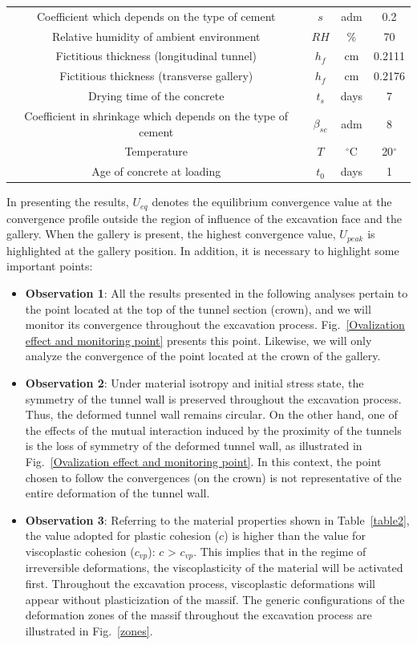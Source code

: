 \documentclass[a4paper,fleqn]{cas-sc}
\begin{document}
\begin{table}
\begin{tabular}{c c c c}
		Coefficient which depends on the type of cement & $s$ & adm & 0.2 \\
		Relative humidity of ambient environment & $RH$ & \% & 70 \\
		Fictitious thickness (longitudinal tunnel) & $h_f$ & cm & 0.2111 \\
		Fictitious thickness (transverse gallery) & $h_f$ & cm & 0.2176 \\
		Drying time of the concrete & $t_s$ & days & 7 \\
		Coefficient in shrinkage which depends on the type of cement & $\beta_{sc}$ & adm & 8 \\
		Temperature & $T$ & $^\circ$C & 20$^\circ$ \\
		Age of concrete at loading & $t_0$ & days & 1 \\
		\hline
	\end{tabular}
	\normalsize
\end{table}
\FloatBarrier
In presenting the results, $U_{eq}$ denotes the equilibrium convergence value at the convergence profile outside the region of influence of the excavation face and the gallery. When the gallery is present, the highest convergence value, $U_{peak}$ is highlighted at the gallery position. In addition, it is necessary to highlight some important points:
\begin{itemize}[]
	\item \textbf{Observation 1}: All the results presented in the following analyses pertain to the point located at the top of the tunnel section (crown), and we will monitor its convergence throughout the excavation process. Fig.~\ref{Ovalization effect and monitoring point} presents this point. Likewise, we will only analyze the convergence of the point located at the crown of the gallery. 
	\item \textbf{Observation 2}: Under material isotropy and initial stress state, the symmetry of the tunnel wall is preserved throughout the excavation process. Thus, the deformed tunnel wall remains circular. On the other hand, one of the effects of the mutual interaction induced by the proximity of the tunnels is the loss of symmetry of the deformed tunnel wall, as illustrated in Fig.~\ref{Ovalization effect and monitoring point}. In this context, the point chosen to follow the convergences (on the crown) is not representative of the entire deformation of the tunnel wall. 
	\item \textbf{Observation 3}: Referring to the material properties shown in Table~\ref{table2}, the value adopted for plastic cohesion ($c$) is higher than the value for viscoplastic cohesion ($c_{vp}$): $c$ > $c_{vp}$. This implies that in the regime of irreversible deformations, the viscoplasticity of the material will be activated first. Throughout the excavation process, viscoplastic deformations will appear without plasticization of the massif. The generic configurations of the deformation zones of the massif throughout the excavation process are illustrated in Fig.~\ref{zones}.
\end{itemize}
\end{document}
